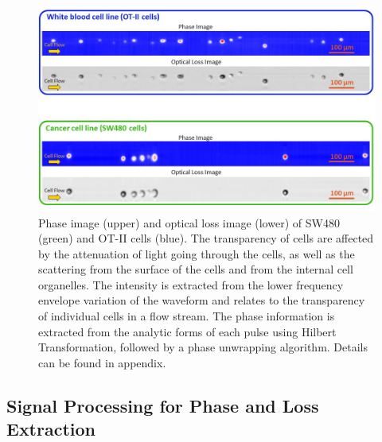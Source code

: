 \documentclass[aps,pra,reprint,superscriptaddress]{revtex4-1}
\begin{document}
\begin{figure}
\includegraphics[scale=0.5]{Figure2DImage.jpg}
\caption{\label{fig:2DImage} Phase image (upper) and optical loss image (lower) of SW480 (green) and OT-II cells (blue). The transparency of cells are affected by the attenuation of light going through the cells, as well as the scattering from the surface of the cells and from the internal cell organelles. The intensity is extracted from the lower frequency envelope variation of the waveform and relates to the transparency of individual cells in a flow stream. The phase information is extracted from the analytic forms of each pulse using Hilbert Transformation, followed by a phase unwrapping algorithm. Details can be found in appendix.}
\end{figure}

\subsection{Signal Processing for Phase and Loss Extraction}
\end{document}

